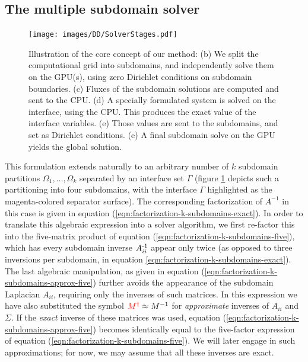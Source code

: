 \subsection{The multiple subdomain solver}
\begin{figure}[t!]
\texttt{[image: images/DD/SolverStages.pdf]}
\caption{Illustration of the core concept of our method: (b) We split the computational grid into subdomains, and independently solve them on the GPU(s), using
  zero Dirichlet conditions on subdomain boundaries. (c) Fluxes of the subdomain solutions are computed and sent to 
  the CPU. (d) A specially formulated system is solved on the interface, using the CPU. This produces the exact value of the interface variables. (e) Those
  values are sent to the subdomains, and set as Dirichlet conditions. (e) A final subdomain solve on the GPU yields the global solution.}
\label{fig:pipeline}
\end{figure}
This formulation extends naturally to an arbitrary number of $k$ subdomain partitions $\Omega_1,\ldots,\Omega_k$ separated by an interface set $\Gamma$ (figure
\ref{fig:pipeline} depicts such a partitioning into four subdomains, with the interface $\Gamma$ highlighted as the magenta-colored separator surface). The
corresponding factorization of $A^{-1}$ in this case is given in equation (\ref{eqn:factorization-k-subdomains-exact}). In order to translate this algebraic expression
into a solver algorithm, we first re-factor this into the five-matrix product of equation (\ref{eqn:factorization-k-subdomains-five}), which has every subdomain
inverse $A_{ii}^{\operatorname{-1}}$ appear only twice (as opposed to three inversions per subdomain, in equation \ref{eqn:factorization-k-subdomains-exact}). The last
algebraic manipulation, as given in equation (\ref{eqn:factorization-k-subdomains-approx-five}) further avoids the appearance of the subdomain Laplacian
$A_{ii}$, requiring only the inverses of such matrices. In this expression we have also substituted the symbol ${\color{red}M^\dagger}\approx M^{-1}$ for
\emph{approximate} inverses of $A_{ii}$ and $\Sigma$. If the \emph{exact} inverse of these matrices was used, equation (\ref{eqn:factorization-k-subdomains-approx-five})
becomes identically equal to the five-factor expression of equation (\ref{eqn:factorization-k-subdomains-five}). We will later engage in such approximations; for now, we
may assume that all these inverses are exact.  



